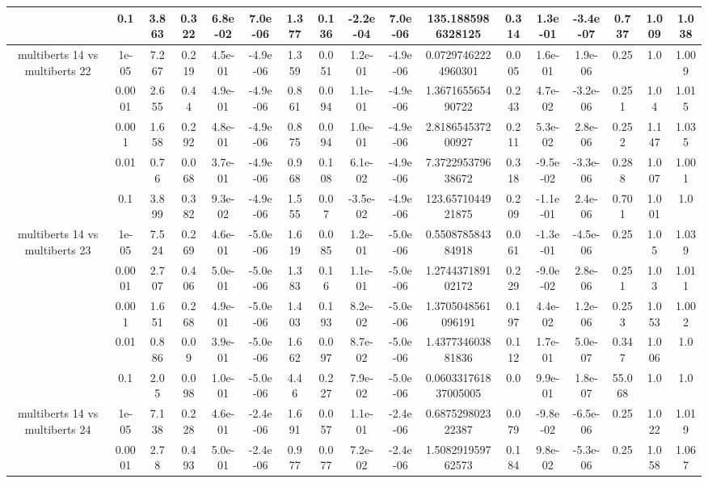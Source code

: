 \begin{tabular}{|c|c|c|c|c|c|c|c|c|c|c|c|c|c|c|c|c|}
 & 0.1 & 3.863 & 0.322 & 6.8e-02 & 7.0e-06 & 1.377 & 0.136 & -2.2e-04 & 7.0e-06 & 135.1885986328125 & 0.314 & 1.3e-01 & -3.4e-07 & 0.737 & 1.009 & 1.038 \\
\hline
\multirow{5}{*}{multiberts 14 vs multiberts 22} & 1e-05 & 7.267 & 0.219 & 4.5e-01 & -4.9e-06 & 1.359 & 0.051 & 1.2e-01 & -4.9e-06 & 0.07297462224960301 & 0.005 & 1.6e-01 & 1.9e-06 & 0.25 & 1.0 & 1.009 \\
 & 0.0001 & 2.655 & 0.44 & 4.9e-01 & -4.9e-06 & 0.861 & 0.094 & 1.1e-01 & -4.9e-06 & 1.367165565490722 & 0.243 & 4.7e-02 & -3.2e-06 & 0.251 & 1.04 & 1.015 \\
 & 0.001 & 1.658 & 0.292 & 4.8e-01 & -4.9e-06 & 0.875 & 0.094 & 1.0e-01 & -4.9e-06 & 2.818654537200927 & 0.211 & 5.3e-02 & 2.8e-06 & 0.252 & 1.147 & 1.035 \\
 & 0.01 & 0.76 & 0.068 & 3.7e-01 & -4.9e-06 & 0.968 & 0.108 & 6.1e-02 & -4.9e-06 & 7.372295379638672 & 0.318 & -9.5e-02 & -3.3e-06 & 0.288 & 1.007 & 1.001 \\
 & 0.1 & 3.899 & 0.382 & 9.3e-02 & -4.9e-06 & 1.555 & 0.07 & -3.5e-02 & -4.9e-06 & 123.6571044921875 & 0.209 & -1.1e-01 & 2.4e-06 & 0.701 & 1.001 & 1.0 \\
\hline
\multirow{5}{*}{multiberts 14 vs multiberts 23} & 1e-05 & 7.524 & 0.269 & 4.6e-01 & -5.0e-06 & 1.619 & 0.085 & 1.2e-01 & -5.0e-06 & 0.550878584384918 & 0.061 & -1.3e-01 & -4.5e-06 & 0.25 & 1.05 & 1.039 \\
 & 0.0001 & 2.707 & 0.406 & 5.0e-01 & -5.0e-06 & 1.383 & 0.16 & 1.1e-01 & -5.0e-06 & 1.274437189102172 & 0.229 & -9.0e-02 & 2.8e-06 & 0.251 & 1.03 & 1.011 \\
 & 0.001 & 1.651 & 0.268 & 4.9e-01 & -5.0e-06 & 1.403 & 0.193 & 8.2e-02 & -5.0e-06 & 1.3705048561096191 & 0.197 & 4.4e-02 & 1.2e-06 & 0.253 & 1.053 & 1.002 \\
 & 0.01 & 0.886 & 0.09 & 3.9e-01 & -5.0e-06 & 1.662 & 0.097 & 8.7e-02 & -5.0e-06 & 1.437734603881836 & 0.112 & 1.7e-01 & 5.0e-07 & 0.347 & 1.006 & 1.0 \\
 & 0.1 & 2.05 & 0.098 & 1.0e-01 & -5.0e-06 & 4.46 & 0.227 & 7.9e-02 & -5.0e-06 & 0.060331761837005005 & 0.0 & 9.9e-01 & 1.8e-07 & 55.068 & 1.0 & 1.0 \\
\hline
\multirow{5}{*}{multiberts 14 vs multiberts 24} & 1e-05 & 7.138 & 0.228 & 4.6e-01 & -2.4e-06 & 1.691 & 0.057 & 1.1e-01 & -2.4e-06 & 0.687529802322387 & 0.079 & -9.8e-02 & -6.5e-06 & 0.25 & 1.022 & 1.019 \\
 & 0.0001 & 2.78 & 0.493 & 5.0e-01 & -2.4e-06 & 0.977 & 0.077 & 7.2e-02 & -2.4e-06 & 1.508291959762573 & 0.184 & 9.8e-02 & -5.3e-06 & 0.25 & 1.058 & 1.067 \\

\end{tabular}
